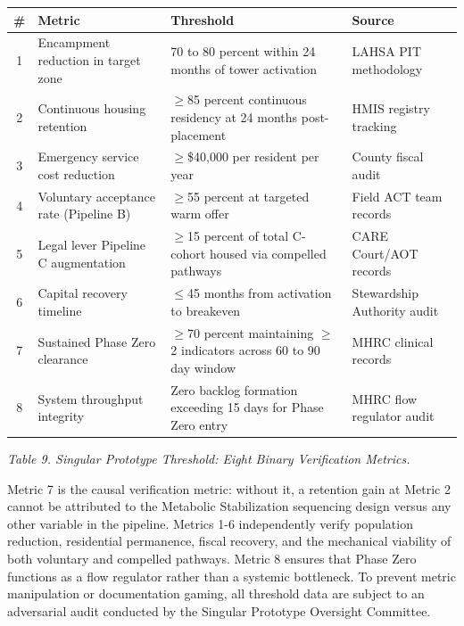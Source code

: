 \documentclass[12pt, letterpaper]{article}
\begin{document}
{\singlespacing
\begin{tabularx}{\textwidth}{@{}cp{4.5cm}Xp{4.2cm}@{}}
\toprule
\rowcolor{rowgray}
\# & Metric & Threshold & Source \\
\midrule
1 & Encampment reduction in target zone & 70 to 80 percent within 24 months of tower activation & LAHSA PIT methodology \\
\rowcolor{rowgray}
2 & Continuous housing retention & $\geq$85 percent continuous residency at 24 months post-placement & HMIS registry tracking \\
3 & Emergency service cost reduction & $\geq$\$40,000 per resident per year & County fiscal audit \\
\rowcolor{rowgray}
4 & Voluntary acceptance rate (Pipeline B) & $\geq$55 percent at targeted warm offer & Field ACT team records \\
5 & Legal lever Pipeline C augmentation & $\geq$15 percent of total C-cohort housed via compelled pathways & CARE Court/AOT records \\
\rowcolor{rowgray}
6 & Capital recovery timeline & $\leq$45 months from activation to breakeven & Stewardship Authority audit \\
7 & Sustained Phase Zero clearance & $\geq$70 percent maintaining $\geq$2 indicators across 60 to 90 day window & MHRC clinical records \\
\rowcolor{rowgray}
8 & System throughput integrity & Zero backlog formation exceeding 15 days for Phase Zero entry & MHRC flow regulator audit \\
\bottomrule
\end{tabularx}\par
\vspace{8pt}
\noindent\textit{Table 9. Singular Prototype Threshold: Eight Binary Verification Metrics.}
\par}

Metric 7 is the causal verification metric: without it, a retention gain at Metric 2 cannot be attributed to the Metabolic Stabilization sequencing design versus any other variable in the pipeline. Metrics 1-6 independently verify population reduction, residential permanence, fiscal recovery, and the mechanical viability of both voluntary and compelled pathways. Metric 8 ensures that Phase Zero functions as a flow regulator rather than a systemic bottleneck. To prevent metric manipulation or documentation gaming, all threshold data are subject to an adversarial audit conducted by the Singular Prototype Oversight Committee.
\end{document}
